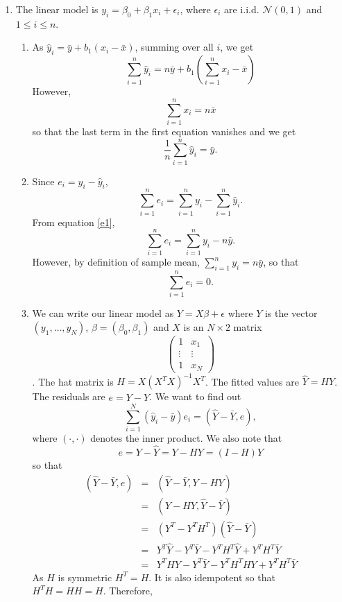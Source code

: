 \documentclass{article}
\begin{document}
\begin{enumerate}
\item The linear model is $y_i = \beta_0 + \beta_1 x_i + \epsilon_i$,
where $\epsilon_i$ are i.i.d. $\mathcal{N}(0, 1)$ and $1 \le i \le n$.
\begin{enumerate}
\item As $\hat{y}_i = \bar{y} + b_1(x_i - \bar{x})$, summing over all $i$,
we get
\[
    \sum_{i=1}^n\hat{y}_i = n\bar{y} + b_1\left(\sum_{i=1}^nx_i - \bar{x}\right)
\]
However,
\[
    \sum_{i=1}^n x_i = n\bar{x}
\]
so that the last term in the first equation vanishes and we get
\begin{equation}\label{e1}
    \frac{1}{n}\sum_{i=1}^n\hat{y}_i = \bar{y}.
\end{equation}
\item Since $e_i = y_i - \hat{y}_i$,
\[
    \sum_{i=1}^ne_i = \sum_{i=1}^ny_i - \sum_{i=1}^n\hat{y}_i.
\]
From equation \eqref{e1},
\[
    \sum_{i=1}^ne_i = \sum_{i=1}^ny_i - n\bar{y}.
\]
However, by definition of sample mean, $\sum_{i=1}^n y_i = n\bar{y}$,
so that
\begin{equation}\label{e2}
\sum_{i=1}^n e_i = 0.
\end{equation}
\item We can write our linear model as $Y = X\beta + \epsilon$ where $Y$ is the vector
$(y_1, \ldots, y_N)$, $\beta = (\beta_0, \beta_1)$ and $X$ is an $N \times 2$ matrix
\[\begin{pmatrix}1 & x_1 \\ \vdots & \vdots \\ 1 & x_N\end{pmatrix}\]. The hat matrix
is $H = X(X^T X)^{-1}X^T$. The fitted values are $\hat{Y} = HY$. The residuals are
$e = Y - \hat{Y}$. We want to find out
\[
    \sum_{i=1}^N(\hat{y}_i - \bar{y})e_i = (\hat{Y} - \bar{Y}, e),
\]
where $(\cdot, \cdot)$ denotes the inner product. We also note that 
\[
    e = Y - \hat{Y} = Y - HY = (I - H)Y
\]
so that 
\begin{eqnarray*}
(\hat{Y} - \bar{Y}, e) &=& (\hat{Y} - \bar{Y}, Y - HY) \\
	&=& (Y - HY, \hat{Y} - \bar{Y}) \\
	&=& (Y^T - Y^TH^T)(\hat{Y} - \bar{Y}) \\
	&=& Y^T\hat{Y} - Y^T\bar{Y} - Y^TH^T\hat{Y} + Y^TH^T\bar{Y} \\
	&=& Y^THY - Y^T\bar{Y} - Y^TH^THY + Y^TH^T\bar{Y}
\end{eqnarray*}	
As $H$ is symmetric $H^T = H$. It is also idempotent so that $H^TH = HH =H$. Therefore,

\end{enumerate}
\end{enumerate}
\end{document}
